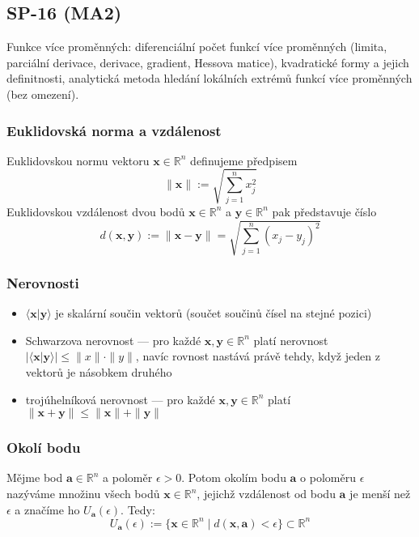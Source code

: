 \subsection{SP-16 (MA2)}
Funkce více proměnných: diferenciální počet funkcí více proměnných (limita, parciální derivace, derivace, gradient, Hessova matice), kvadratické formy a jejich definitnosti, analytická metoda hledání lokálních extrémů funkcí více proměnných (bez omezení).

\subsubsection*{Euklidovská norma a vzdálenost}
Euklidovskou normu vektoru $\textbf{x} \in \mathbb{R}^n$ definujeme předpisem $$ \| \textbf{x} \| := \sqrt{\sum_{j=1}^n x^2_j}$$
Euklidovskou vzdálenost dvou bodů $\textbf{x} \in \mathbb{R}^n$ a $\textbf{y} \in \mathbb{R}^n$ pak představuje číslo $$d(\textbf{x},\textbf{y}) := \| \textbf{x} - \textbf{y} \| = \sqrt{\sum_{j=1}^n (x_j - y_j)^2}$$

\subsubsection*{Nerovnosti}
\begin{itemize}
	\item $\langle \textbf{x} | \textbf{y} \rangle$ je skalární součin vektorů (součet součinů čísel na stejné pozici)
	\item Schwarzova nerovnost --- pro každé $\textbf{x}, \textbf{y} \in \mathbb{R}^n$ platí nerovnost $| \langle \textbf{x} | \textbf{y} \rangle | \leq \|x\| \cdot \|y\|$, navíc rovnost nastává právě tehdy, když jeden z vektorů je násobkem druhého
	\item trojúhelníková nerovnost --- pro každé $\textbf{x}, \textbf{y} \in \mathbb{R}^n$ platí $\|\textbf{x} + \textbf{y} \| \leq \|\textbf{x}\| + \| \textbf{y} \|$
\end{itemize}

\subsubsection*{Okolí bodu}
Mějme bod $\textbf{a} \in \mathbb{R}^n$ a poloměr $\epsilon > 0$. Potom okolím bodu $\textbf{a}$ o poloměru $\epsilon$ nazýváme množinu všech bodů $\textbf{x} \in \mathbb{R}^n$, jejichž vzdálenost od bodu $\textbf{a}$ je menší než $\epsilon$ a značíme ho $U_\textbf{a}(\epsilon)$. Tedy:
$$U_\textbf{a}(\epsilon) := \{\textbf{x} \in \mathbb{R}^n \mid d(\textbf{x},\textbf{a}) < \epsilon\} \subset \mathbb{R}^n$$

